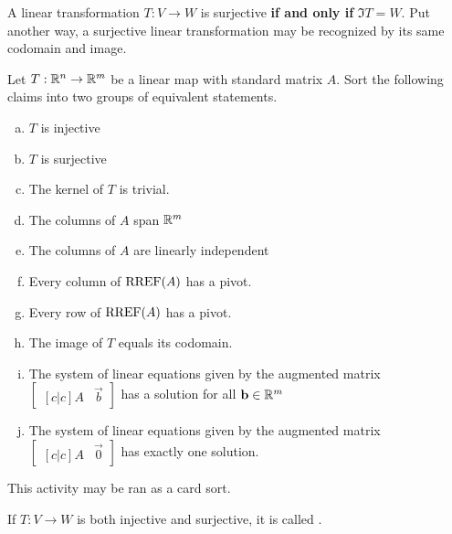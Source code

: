 \begin{applicationActivities}
\begin{fact}
A linear transformation $T:V \rightarrow W$ is surjective \textbf{if and only if} $\Im T = W$. Put another way, a surjective linear transformation may be
recognized by its same codomain and image.
\end{fact}

\begin{activity}{15}
Let $T: \mathbb{R}^n \rightarrow \mathbb{R}^m$ be a linear map with standard matrix $A$.
Sort the following claims into two groups of equivalent statements.
\begin{multicols}{2}
\begin{enumerate}[(a)]
\item $T$ is injective
\item $T$ is surjective
\item The kernel of \(T\) is trivial.
\item The columns of $A$ span $\mathbb{R}^m$
\item The columns of $A$ are linearly independent
\item Every column of $\operatorname{RREF}(A)$ has a pivot.
\item Every row of $\operatorname{RREF}(A)$ has a pivot.
\item The image of \(T\) equals its codomain.
\item The system of linear equations given by the augmented matrix $\begin{bmatrix}[c|c]A & \vec{b} \end{bmatrix}$ has a solution for all $\mathbf{b} \in \mathbb{R}^m$
\item The system of linear equations given by the augmented matrix $\begin{bmatrix}[c|c] A & \vec{0} \end{bmatrix}$ has exactly one solution.
\end{enumerate}
\end{multicols}
\begin{instructorNote}
  This activity may be ran as a card sort.
\end{instructorNote}


\end{activity}

\begin{definition}
If $T: V \rightarrow W$ is both injective and surjective, it is called .
\end{definition}


\end{applicationActivities}
